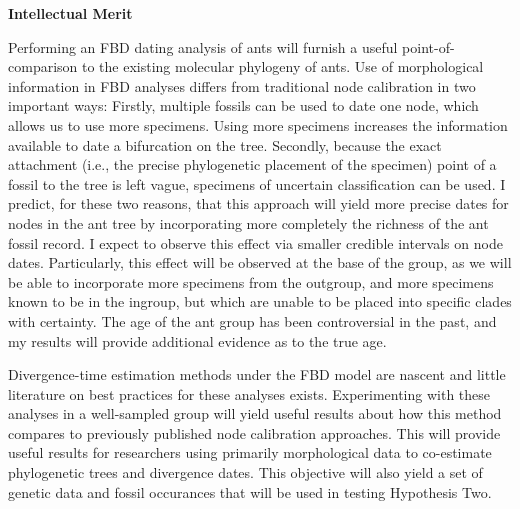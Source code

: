 \documentclass[]{article}
\begin{document}
\textbf{Intellectual Merit} \par
Performing an FBD dating analysis of ants will furnish a useful point-of-comparison to the existing molecular phylogeny of ants.  Use of morphological information in FBD analyses differs from traditional node calibration in two important ways: Firstly, multiple fossils can be used to date one node, which allows us to use more specimens. Using more specimens increases the information available to date a bifurcation on the tree. Secondly, because the exact attachment (i.e., the precise phylogenetic placement of the specimen)  point of a fossil to the tree is left vague, specimens of uncertain classification can be used. I predict, for these two reasons, that this approach will yield more precise dates for nodes in the ant tree by incorporating  more completely the richness of the ant fossil record. I expect to observe this effect via smaller credible intervals on node dates. Particularly, this effect will be observed at the base of the group, as we will be able to incorporate more specimens from the outgroup, and more specimens known to be in the ingroup, but which are unable to be placed into specific clades with certainty. The age of the ant group has been controversial in the past, and my results will provide additional evidence as to the true age. \par
Divergence-time estimation methods under the FBD model are nascent and little literature on best practices for these analyses exists. Experimenting with these analyses in a well-sampled group will yield useful results about how this method compares to previously published node calibration approaches. This will provide useful results for researchers using primarily morphological data to co-estimate phylogenetic trees and divergence dates. This objective will also yield a set of genetic data and fossil occurances that will be used in testing Hypothesis Two. \par
\end{document}
